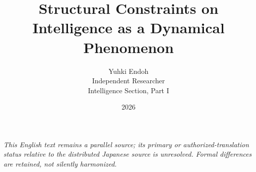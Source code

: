 \documentclass[11pt,a4paper]{article}
\title{Structural Constraints on Intelligence as a Dynamical Phenomenon}
\author{Yuhki Endoh\\{\small Independent Researcher}\\{\small Intelligence Section, Part I}}
\date{2026}
\begin{document}
\maketitle

\noindent\textit{This English text remains a parallel source; its primary or authorized-translation status relative to the distributed Japanese source is unresolved. Formal differences are retained, not silently harmonized.}


\begin{abstract}

\end{abstract}

\setcounter{tocdepth}{1}
\tableofcontents
\clearpage























\end{document}
